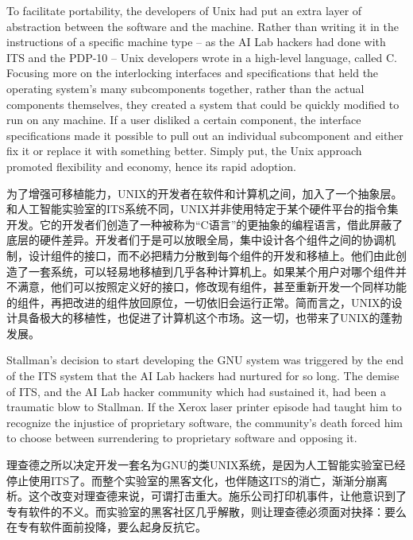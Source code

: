 \ifdefined\eng
To facilitate portability, the developers of Unix had put an extra layer of abstraction between the software and the machine. Rather than writing it in the instructions of a specific machine type -- as the AI Lab hackers had done with ITS and the PDP-10 -- Unix developers wrote in a high-level language, called C. Focusing more on the interlocking interfaces and specifications that held the operating system's many subcomponents together, rather than the actual components themselves, they created a system that could be quickly modified to run on any machine. If a user disliked a certain component, the interface specifications made it possible to pull out an individual subcomponent and either fix it or replace it with something better. Simply put, the Unix approach promoted flexibility and economy, hence its rapid adoption.
\fi

\ifdefined\chs
为了增强可移植能力，UNIX的开发者在软件和计算机之间，加入了一个抽象层。和人工智能实验室的ITS系统不同，UNIX并非使用特定于某个硬件平台的指令集开发。它的开发者们创造了一种被称为“C语言”的更抽象的编程语言，借此屏蔽了底层的硬件差异。开发者们于是可以放眼全局，集中设计各个组件之间的协调机制，设计组件的接口，而不必把精力分散到每个组件的开发和移植上。他们由此创造了一套系统，可以轻易地移植到几乎各种计算机上。如果某个用户对哪个组件并不满意，他们可以按照定义好的接口，修改现有组件，甚至重新开发一个同样功能的组件，再把改进的组件放回原位，一切依旧会运行正常。简而言之，UNIX的设计具备极大的移植性，也促进了计算机这个市场。这一切，也带来了UNIX的蓬勃发展。
\fi

\ifdefined\eng
Stallman's decision to start developing the GNU system was triggered by the end of the ITS system that the AI Lab hackers had nurtured for so long. The demise of ITS, and the AI Lab hacker community which had sustained it, had been a traumatic blow to Stallman. If the Xerox laser printer episode had taught him to recognize the injustice of proprietary software, the community's death forced him to choose between surrendering to proprietary software and opposing it.
\fi

\ifdefined\chs
理查德之所以决定开发一套名为GNU的类UNIX系统，是因为人工智能实验室已经停止使用ITS了。而整个实验室的黑客文化，也伴随这ITS的消亡，渐渐分崩离析。这个改变对理查德来说，可谓打击重大。施乐公司打印机事件，让他意识到了专有软件的不义。而实验室的黑客社区几乎解散，则让理查德必须面对抉择：要么在专有软件面前投降，要么起身反抗它。
\fi


